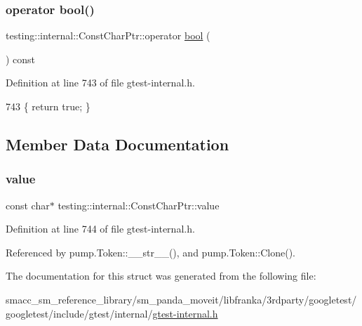 \subsubsection{\texorpdfstring{operator bool()}{operator bool()}}
{\footnotesize\ttfamily testing\+::internal\+::\+Const\+Char\+Ptr\+::operator \hyperlink{classbool}{bool} (\begin{DoxyParamCaption}{ }\end{DoxyParamCaption}) const\hspace{0.3cm}{\ttfamily [inline]}}



Definition at line 743 of file gtest-\/internal.\+h.


\begin{DoxyCode}
743 \{ \textcolor{keywordflow}{return} \textcolor{keyword}{true}; \}
\end{DoxyCode}


\subsection{Member Data Documentation}
\mbox{\label{structtesting_1_1internal_1_1ConstCharPtr_adba40d23d5986904b605946f643cf26e}} 
\subsubsection{\texorpdfstring{value}{value}}
{\footnotesize\ttfamily const char$\ast$ testing\+::internal\+::\+Const\+Char\+Ptr\+::value}



Definition at line 744 of file gtest-\/internal.\+h.



Referenced by pump.\+Token\+::\+\_\+\+\_\+str\+\_\+\+\_\+(), and pump.\+Token\+::\+Clone().



The documentation for this struct was generated from the following file\+:\begin{DoxyCompactItemize}
\item 
smacc\+\_\+sm\+\_\+reference\+\_\+library/sm\+\_\+panda\+\_\+moveit/libfranka/3rdparty/googletest/googletest/include/gtest/internal/\hyperlink{gtest-internal_8h}{gtest-\/internal.\+h}\end{DoxyCompactItemize}
